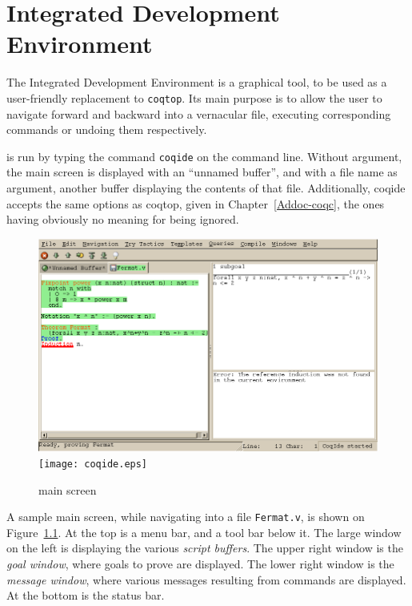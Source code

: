 \chapter{\Coq{} Integrated Development Environment}
\label{Addoc-coqide}

The \Coq{} Integrated Development Environment is a graphical tool, to
be used as a user-friendly replacement to \texttt{coqtop}. Its main
purpose is to allow the user to navigate forward and backward into a
\Coq{} vernacular file, executing corresponding commands or undoing
them respectively. %

\CoqIDE{} is run by typing the command \verb|coqide| on the command
line. Without argument, the main screen is displayed with an ``unnamed
buffer'', and with a file name as argument, another buffer displaying
the contents of that file. Additionally, coqide accepts the same
options as coqtop, given in Chapter~\ref{Addoc-coqc}, the ones having
obviously no meaning for \CoqIDE{} being ignored.

\begin{figure}[t]
\begin{center}
\ifpdf   %
\includegraphics[width=1.0\textwidth]{coqide.png}
\else
\texttt{[image: coqide.eps]}
\fi
\end{center}
\caption{\CoqIDE{} main screen}
\label{fig:coqide}
\end{figure}

A sample \CoqIDE{} main screen, while navigating into a file
\verb|Fermat.v|, is shown on Figure~\ref{fig:coqide}.  At
the top is a menu bar, and a tool bar below it. The large window on
the left is displaying the various \emph{script buffers}. The upper right
window is the \emph{goal window}, where goals to 
prove are displayed. The lower right window is the \emph{message window},
where various messages resulting from commands are displayed. At the
bottom is the status bar.

